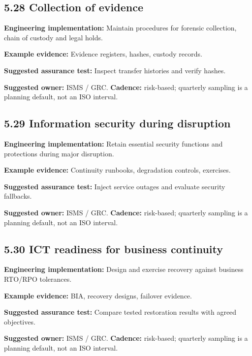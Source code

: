 \documentclass[11pt,letterpaper]{article}
\begin{document}
\subsection{5.28 Collection of evidence}
\textbf{Engineering implementation:} Maintain procedures for forensic collection, chain of custody and legal holds.\par
\textbf{Example evidence:} Evidence registers, hashes, custody records.\par
\textbf{Suggested assurance test:} Inspect transfer histories and verify hashes.\par
\textbf{Suggested owner:} ISMS / GRC. \textbf{Cadence:} risk-based; quarterly sampling is a planning default, not an ISO interval.\par
{}
\subsection{5.29 Information security during disruption}
\textbf{Engineering implementation:} Retain essential security functions and protections during major disruption.\par
\textbf{Example evidence:} Continuity runbooks, degradation controls, exercises.\par
\textbf{Suggested assurance test:} Inject service outages and evaluate security fallbacks.\par
\textbf{Suggested owner:} ISMS / GRC. \textbf{Cadence:} risk-based; quarterly sampling is a planning default, not an ISO interval.\par
{}
\subsection{5.30 ICT readiness for business continuity}
\textbf{Engineering implementation:} Design and exercise recovery against business RTO/RPO tolerances.\par
\textbf{Example evidence:} BIA, recovery designs, failover evidence.\par
\textbf{Suggested assurance test:} Compare tested restoration results with agreed objectives.\par
\textbf{Suggested owner:} ISMS / GRC. \textbf{Cadence:} risk-based; quarterly sampling is a planning default, not an ISO interval.\par
{}
\end{document}
